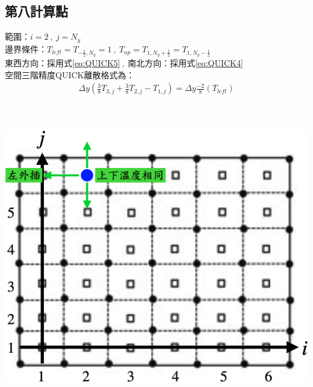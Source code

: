 \documentclass[12pt]{article}
\begin{document}
\subsection{第八計算點}
 \begin{minipage}{0.6\textwidth}
   \noindent 範圍：$i=2\ ,\ j=N_{y}$\\[1.5ex]
   \noindent 邊界條件：$T_{left} = T_{-\frac{1}{2},N_{y}}= 1\ ,\ T_{up} = T_{1,N_{y}+\frac{1}{2}}=T_{1,N_{y}-\frac{1}{2}}$\\[1.5ex]
   \noindent 東西方向：採用式\eqref{eq:QUICK5}$\ ,\ $南北方向：採用式\eqref{eq:QUICK4}\\[1.5ex]
   \noindent 空間三階精度QUICK離散格式為：
   \begin{equation*}\begin{split}
   \Delta y(\frac{3}{8}T_{3,j} + \frac{3}{8}T_{2,j} -T_{1,j}) =\Delta y \frac{-2}{8}(T_{left}) \\[1.5ex]
   \end{split}\end{equation*}
   \end{minipage}                          
   \hfill
   \begin{minipage}{0.34\textwidth}
   \centering
   \includegraphics[width=\linewidth,height=9\baselineskip]{27.png}
   \label{fig:8th point}
\end{minipage}
\end{document}
